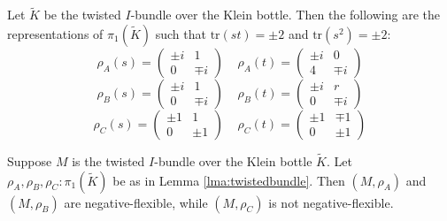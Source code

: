 \documentclass[10pt,a4paper]{amsart}
\begin{document}
\begin{lemma}\label{lma:twistedbundle}
Let $\tilde{K}$ be the twisted $I$-bundle over the Klein bottle. Then the following are the representations of $\pi_1(\tilde{K})$ such that $\text{tr}(st) = \pm 2$ and $\text{tr}(s^2) = \pm 2$:
\begin{equation}
	\rho_A(s) = \begin{pmatrix}\pm i&1\\0&\mp i\end{pmatrix} \ \ \ \ \ \rho_A(t) = \begin{pmatrix}\pm i&0\\4&\mp i\end{pmatrix}
\end{equation}
\begin{equation}
	\rho_B(s) = \begin{pmatrix}\pm i&1\\0&\mp i\end{pmatrix} \ \ \ \ \ \rho_B(t) = \begin{pmatrix}\pm i&r\\0&\mp i\end{pmatrix}
\end{equation}
\begin{equation}
	\rho_C(s) = \begin{pmatrix}\pm1&1\\0&\pm1\end{pmatrix} \ \ \ \ \ \rho_C(t) = \begin{pmatrix}\pm1&\mp1\\0&\pm 1\end{pmatrix}
\end{equation}
\end{lemma}

\begin{lemma}\label{lma:ibundlenegative}
Suppose $M$ is the twisted $I$-bundle over the Klein bottle $\tilde{K}$. Let $\rho_A, \rho_B, \rho_C: \pi_1(\tilde{K})$ be as in Lemma \ref{lma:twistedbundle}. Then $(M, \rho_A)$ and $(M, \rho_B)$ are negative-flexible, while $(M, \rho_C)$ is not negative-flexible. 
\end{lemma}
\end{document}
